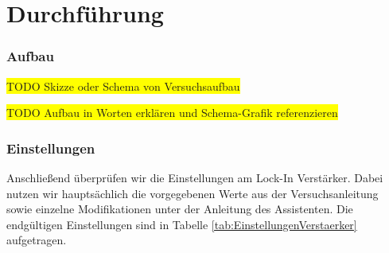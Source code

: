 \section{Durchführung}

\subsubsection*{Aufbau}

\colorbox{yellow}{TODO Skizze oder Schema von Versuchsaufbau}

\colorbox{yellow}{TODO Aufbau in Worten erklären und Schema-Grafik referenzieren}

\subsubsection*{Einstellungen}

Anschließend überprüfen wir die Einstellungen am Lock-In Verstärker.
Dabei nutzen wir hauptsächlich die vorgegebenen Werte aus der Versuchsanleitung \cite{Anleitung} sowie einzelne Modifikationen unter der Anleitung des Assistenten.
Die endgültigen Einstellungen sind in Tabelle \ref{tab:EinstellungenVerstaerker} aufgetragen.

